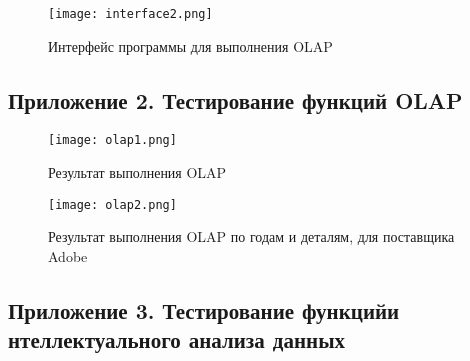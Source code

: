 \begin{figure}[h]
  \centering
  \texttt{[image: interface2.png]}
  \caption{Интерфейс программы для выполнения OLAP}
  \label{olap-interface}
\end{figure}

\subsection{Приложение 2. Тестирование функций OLAP}

\begin{figure}[h]
  \centering
  \texttt{[image: olap1.png]}
  \caption{Результат выполнения OLAP}
  \label{olap-res-2}
\end{figure}

\begin{figure}[h]
  \centering
  \texttt{[image: olap2.png]}
  \caption{Результат выполнения OLAP по годам и деталям, для поставщика Adobe}
  \label{olap-res-1}
\end{figure}

\subsection{Приложение 3. Тестирование функцийи нтеллектуального анализа данных}

